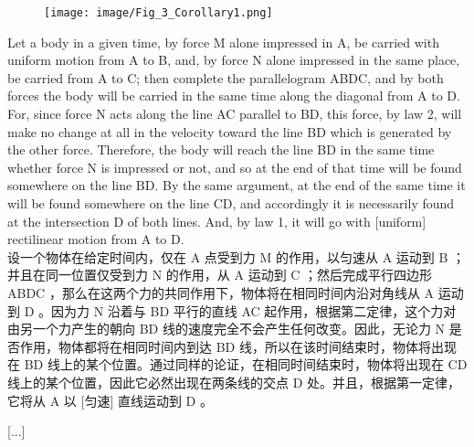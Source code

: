 \documentclass{article}
\begin{document}
\addtolength{\leftskip}{-1cm}
\addtolength{\rightskip}{-1cm}
\begin{figure}
    \centering
    \texttt{[image: image/Fig\_3\_Corollary1.png]}
\end{figure}
\noindent Let a body in a given time, by force M alone impressed in A, be carried with uniform motion from A to B, and, by force N alone impressed in the same place, be carried from A to C; then complete the parallelogram ABDC, and by both forces the body will be carried in the same time along the diagonal from A to D. For, since force N acts along the line AC parallel to BD, this force, by law 2, will make no change at all in the velocity toward the line BD which is generated by the other force. Therefore, the body will reach the line BD in the same time whether force N is impressed or not, and so at the end of that time will be found somewhere on the line BD. By the same argument, at the end of the same time it will be found somewhere on the line CD, and accordingly it is necessarily found at the intersection D of both lines. And, by law 1, it will go with [uniform] rectilinear motion from A to D.\\
设一个物体在给定时间内，仅在 A 点受到力 M 的作用，以匀速从 A 运动到 B ；并且在同一位置仅受到力 N 的作用，从 A 运动到 C ；然后完成平行四边形 ABDC ，那么在这两个力的共同作用下，物体将在相同时间内沿对角线从 A 运动到 D 。因为力 N 沿着与 BD 平行的直线 AC 起作用，根据第二定律，这个力对由另一个力产生的朝向 BD 线的速度完全不会产生任何改变。因此，无论力 N 是否作用，物体都将在相同时间内到达 BD 线，所以在该时间结束时，物体将出现在 BD 线上的某个位置。通过同样的论证，在相同时间结束时，物体将出现在 CD 线上的某个位置，因此它必然出现在两条线的交点 D 处。并且，根据第一定律，它将从 A 以 [匀速] 直线运动到 D 。\\

\begin{center}
    [...]
\end{center}
\end{document}
